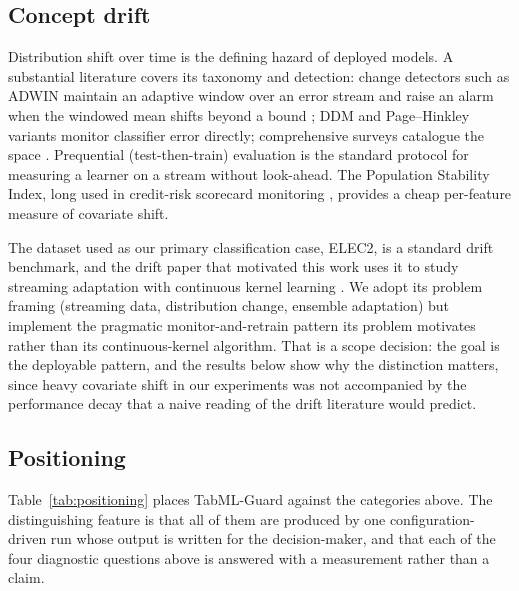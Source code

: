\documentclass{ieeeaccess}
\begin{document}
\subsection{Concept drift}
Distribution shift over time is the defining hazard of deployed models. A substantial literature covers its taxonomy and detection: change detectors such as ADWIN maintain an adaptive window over an error stream and raise an alarm when the windowed mean shifts beyond a bound \cite{bifet2007adwin}; DDM and Page--Hinkley variants monitor classifier error directly; comprehensive surveys catalogue the space \cite{gama2014survey,zliobaite2010learning}. Prequential (test-then-train) evaluation is the standard protocol for measuring a learner on a stream without look-ahead. The Population Stability Index, long used in credit-risk scorecard monitoring \cite{siddiqi2005credit}, provides a cheap per-feature measure of covariate shift.

The dataset used as our primary classification case, ELEC2, is a standard drift benchmark, and the drift paper that motivated this work uses it to study streaming adaptation with continuous kernel learning \cite{drift2024}. We adopt its problem framing (streaming data, distribution change, ensemble adaptation) but implement the pragmatic monitor-and-retrain pattern its problem motivates rather than its continuous-kernel algorithm. That is a scope decision: the goal is the deployable pattern, and the results below show why the distinction matters, since heavy covariate shift in our experiments was not accompanied by the performance decay that a naive reading of the drift literature would predict.

\subsection{Positioning}
Table~\ref{tab:positioning} places TabML-Guard against the categories above. The distinguishing feature is that all of them are produced by one configuration-driven run whose output is written for the decision-maker, and that each of the four diagnostic questions above is answered with a measurement rather than a claim.
\end{document}
